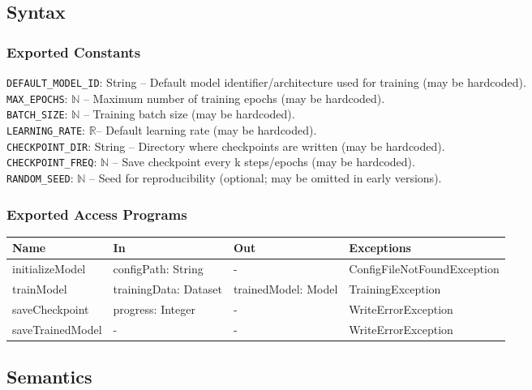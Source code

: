 \documentclass[12pt, titlepage]{article}
\newcommand{\Real}{\ensuremath{\mathbb{R}}}
\begin{document}
\subsection{Syntax}

\subsubsection{Exported Constants}
\texttt{DEFAULT\_MODEL\_ID}: String -- Default model identifier/architecture used for training (may be hardcoded).\\
\texttt{MAX\_EPOCHS}: $\mathbb{N}$ -- Maximum number of training epochs (may be hardcoded).\\
\texttt{BATCH\_SIZE}: $\mathbb{N}$ -- Training batch size (may be hardcoded).\\
\texttt{LEARNING\_RATE}: \Real -- Default learning rate (may be hardcoded).\\
\texttt{CHECKPOINT\_DIR}: String -- Directory where checkpoints are written (may be hardcoded).\\
\texttt{CHECKPOINT\_FREQ}: $\mathbb{N}$ -- Save checkpoint every k steps/epochs (may be hardcoded).\\
\texttt{RANDOM\_SEED}: $\mathbb{N}$ -- Seed for reproducibility (optional; may be omitted in early versions).

\subsubsection{Exported Access Programs}

\begin{center}
\begin{tabular}{p{3cm} p{3.5cm} p{4cm} p{4cm}}
\hline
\textbf{Name} & \textbf{In} & \textbf{Out} & \textbf{Exceptions} \\
\hline
initializeModel & configPath: String & - & ConfigFileNotFoundException \\
\hline
trainModel & trainingData: Dataset & trainedModel: Model & TrainingException \\
\hline
saveCheckpoint & progress: Integer & - & WriteErrorException \\
\hline
\hline
saveTrainedModel & - & - & WriteErrorException \\

\end{tabular}
\end{center}

\subsection{Semantics}
\end{document}
